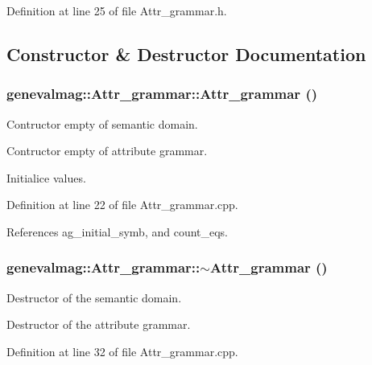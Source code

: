 Definition at line 25 of file Attr\_\-grammar.h.



\subsection{Constructor \& Destructor Documentation}
\hypertarget{classgenevalmag_1_1Attr__grammar_a4163922d72d60143cd36008ab7f7abce}{
\subsubsection[{Attr\_\-grammar}]{\setlength{\rightskip}{0pt plus 5cm}genevalmag::Attr\_\-grammar::Attr\_\-grammar ()}}
\label{classgenevalmag_1_1Attr__grammar_a4163922d72d60143cd36008ab7f7abce}
Contructor empty of semantic domain.

Contructor empty of attribute grammar. 

Initialice values. 



Definition at line 22 of file Attr\_\-grammar.cpp.



References ag\_\-initial\_\-symb, and count\_\-eqs.

\hypertarget{classgenevalmag_1_1Attr__grammar_a4655bdc8253f4d480fd68441363a3cd0}{
\subsubsection[{$\sim$Attr\_\-grammar}]{\setlength{\rightskip}{0pt plus 5cm}genevalmag::Attr\_\-grammar::$\sim$Attr\_\-grammar ()}}
\label{classgenevalmag_1_1Attr__grammar_a4655bdc8253f4d480fd68441363a3cd0}
Destructor of the semantic domain.

Destructor of the attribute grammar. 

Definition at line 32 of file Attr\_\-grammar.cpp.



